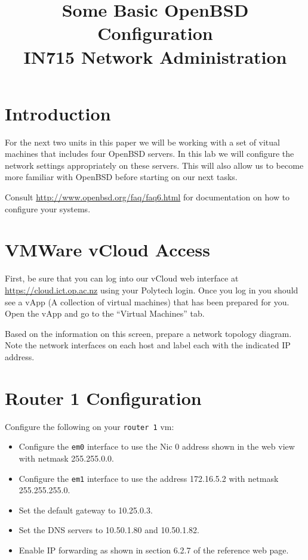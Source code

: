 \documentclass{article}
\begin{document}
\title{Some Basic OpenBSD Configuration\\ IN715 Network Administration}
\date{}
\maketitle

\section{Introduction}
For the next two units in this paper we will be working with a set of vitual machines that includes four OpenBSD servers.  In this lab we will configure the network settings appropriately on these servers. This will also allow us to become more familiar with OpenBSD before starting on our next tasks.

Consult \url{http://www.openbsd.org/faq/faq6.html} for documentation on how to configure your systems.

\section{VMWare vCloud Access}
First, be sure that you can log into our vCloud web interface at \url{https://cloud.ict.op.ac.nz} using your Polytech login. Once you log in you should see a vApp (A collection of virtual machines) that has been prepared for you.  Open the vApp and go to the ``Virtual Machines'' tab.

Based on the information on this screen, prepare a network topology diagram. Note the network interfaces on each host and label each with the indicated IP address.

\section{Router 1 Configuration}
Configure the following on your \texttt{router 1} vm:

\begin{itemize}
	\item Configure the \texttt{em0} interface to use the Nic 0 address shown in the web view with netmask 255.255.0.0.
	\item Configure the \texttt{em1} interface to use the address 172.16.5.2 with netmask 255.255.255.0.
	\item Set the default gateway to 10.25.0.3.
	\item Set the DNS servers to 10.50.1.80 and 10.50.1.82.
	\item Enable IP forwarding as shown in section 6.2.7 of the reference web page.
\end{itemize}
\end{document}
